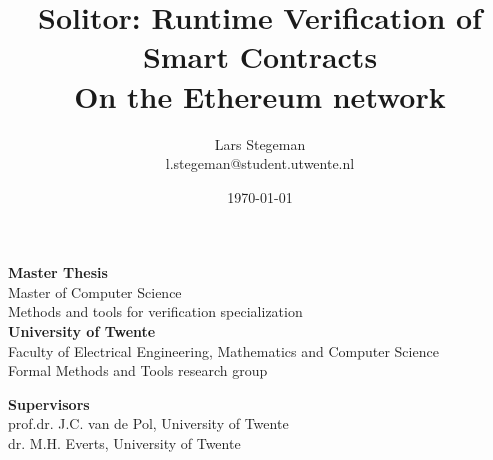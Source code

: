 \documentclass[a4paper]{article}
\title{\vspace{3.0cm}\textbf{Solitor: Runtime Verification of Smart Contracts}\\
\large On the Ethereum network \\}
\author{Lars Stegeman\\ l.stegeman@student.utwente.nl}
\date{\vspace{0.5cm}\today}
\begin{document}
\begin{titlepage}
\maketitle
\vspace{1.5cm}
\begin{center}
\textbf{Master Thesis}\\
Master of Computer Science\\
Methods and tools for verification specialization\\
\vspace{0.5cm}
\textbf{University of Twente}\\
Faculty of Electrical Engineering, Mathematics and Computer Science\\
Formal Methods and Tools research group\\
\end{center}
\vfill
\textbf{Supervisors}\\
prof.dr. J.C. van de Pol, University of Twente\\
dr. M.H. Everts, University of Twente\\
\end{titlepage}

\newpage
\end{document}
